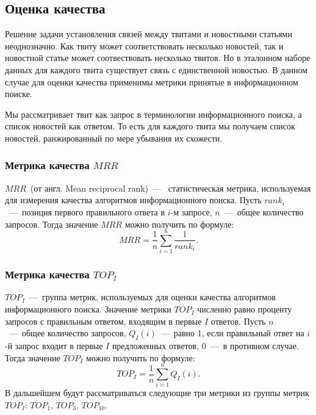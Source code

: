 \subsection{Оценка качества}
    Решение задачи установления связей между твитами и новостными статьями неоднозначно.
    Как твиту может соответствовать несколько новостей, так и новостной статье может соотвествовать несколько твитов.
    Но в эталонном наборе данных для каждого твита существует связь с единственной новостью.
    В данном случае для оценки качества применимы метрики принятые в информационном поиске.

    Мы рассматривает твит как запрос в терминологии информационного поиска, а список новостей как ответом.
    То есть для каждого твита мы получаем список новостей, ранжированный по мере убывания их схожести.

    \subsubsection{Метрика качества $MRR$}
        $MRR$~(от англ. Mean reciprocal rank)~---~ статистическая метрика, используемая для измерения качества алгоритмов информационного поиска.
        Пусть $rank_i$~---~позиция первого правильного ответа в $i$-м запросе, $n$~---~общее количество запросов.
        Тогда значение $MRR$ можно получить по формуле:
        $$MRR = \dfrac{1}{n} \sum_{i=1}^n \dfrac{1}{rank_i}.$$

    \subsubsection{Метрика качества $TOP_I$}
        $TOP_I$~---~группа метрик, используемых для оценки качества алгоритмов информационного поиска. Значение метрики $TOP_I$
        численно равно проценту запросов с правильным ответом, входящим в первые $I$ ответов.
        Пусть $n$~---~общее количество запросов, $Q_I(i)$~---~равно 1, если правильный ответ на $i$-й запрос входит в первые $I$ предложенных ответов, 0~---~в противном случае.
        Тогда значение $TOP_I$ можно получить по формуле:
        $$TOP_I=\dfrac{1} {n} \sum_{i=1}^n Q_I(i).$$
        В дальшейшем будут рассматриваться следующие три метрики из группы метрик $TOP_I$: $TOP_1$, $TOP_3$, $TOP_{10}$.


